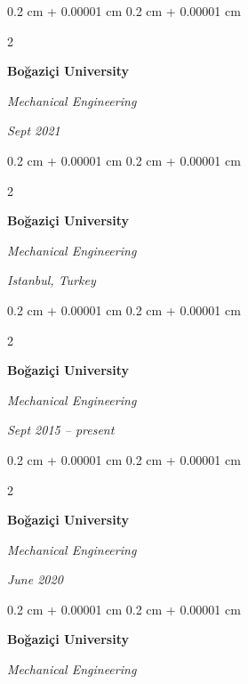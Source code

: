 \documentclass[10pt, letterpaper]{article}
\newenvironment{onecolentry}{
    \begin{adjustwidth}{
        0.2 cm + 0.00001 cm
    }{
        0.2 cm + 0.00001 cm
    }
}{
    \end{adjustwidth}
} %
\newenvironment{twocolentry}[2][]{
    \onecolentry
    \def\secondColumn{#2}
    \setcolumnwidth{\fill, 4.5 cm}
    \begin{paracol}{2}
}{
    \switchcolumn \raggedleft \secondColumn
    \end{paracol}
    \endonecolentry
} %
\begin{document}
        \vspace{0.2 cm}

        \begin{twocolentry}{
            
            
        \textit{Sept 2021}}
            \textbf{Boğaziçi University}

            \textit{Mechanical Engineering}
        \end{twocolentry}



        \vspace{0.2 cm}

        \begin{twocolentry}{
        \textit{Istanbul, Turkey}    
            
        }
            \textbf{Boğaziçi University}

            \textit{Mechanical Engineering}
        \end{twocolentry}



        \vspace{0.2 cm}

        \begin{twocolentry}{
            
            
        \textit{Sept 2015 – present}}
            \textbf{Boğaziçi University}

            \textit{Mechanical Engineering}
        \end{twocolentry}



        \vspace{0.2 cm}

        \begin{twocolentry}{
            
            
        \textit{June 2020}}
            \textbf{Boğaziçi University}

            \textit{Mechanical Engineering}
        \end{twocolentry}



        \vspace{0.2 cm}

        \begin{onecolentry}
            \textbf{Boğaziçi University}

            \textit{Mechanical Engineering}
        \end{onecolentry}
\end{document}
